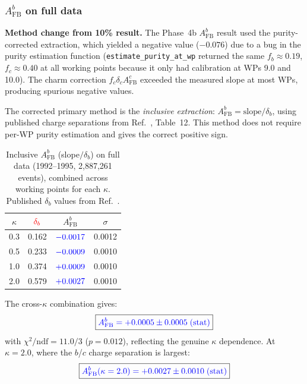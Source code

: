 \documentclass[11pt,a4paper]{article}
\newcommand{\measured}[1]{\textcolor{blue}{#1}}
\newcommand{\external}[1]{\textcolor{red}{#1}}
\begin{document}
\subsubsection{$A_\text{FB}^b$ on full data}

\textbf{Method change from 10\% result.}
The Phase~4b $A_\text{FB}^b$ result used the purity-corrected
extraction, which yielded a negative value ($-0.076$) due to a
bug in the purity estimation function (\texttt{estimate\_purity\_at\_wp}
returned the same $f_b \approx 0.19$, $f_c \approx 0.40$ at all
working points because it only had calibration at WPs 9.0 and 10.0).
The charm correction $f_c \delta_c A_\text{FB}^c$ exceeded the
measured slope at most WPs, producing spurious negative values.

The corrected primary method is the \emph{inclusive extraction}:
$A_\text{FB}^b = \text{slope} / \delta_b$, using published charge
separations from Ref.~\cite{LEP:EWWG:2005}, Table~12.
This method does not require per-WP purity estimation and gives
the correct positive sign.

\begin{table}[htbp]
\centering
\caption{Inclusive $A_\text{FB}^b$ (slope$/\delta_b$) on full data
(1992--1995, 2,887,261 events), combined across working points
for each $\kappa$.
Published $\delta_b$ values from Ref.~\cite{LEP:EWWG:2005}.}
\label{tbl:afb_fulldata_kappa}
\begin{tabular}{cccc}
\toprule
$\kappa$ & $\external{\delta_b}$ &
$A_\text{FB}^b$ & $\sigma$ \\
\midrule
0.3 & 0.162 & $\measured{-0.0017}$ & 0.0012 \\
0.5 & 0.233 & $\measured{-0.0009}$ & 0.0010 \\
1.0 & 0.374 & $\measured{+0.0009}$ & 0.0010 \\
2.0 & 0.579 & $\measured{+0.0027}$ & 0.0010 \\
\bottomrule
\end{tabular}
\end{table}

The cross-$\kappa$ combination gives:
\begin{equation}
\boxed{
\measured{A_\text{FB}^b = +0.0005 \pm 0.0005\;\text{(stat)}}
}
\label{eq:afb_combined_fulldata}
\end{equation}
with $\chi^2/\text{ndf} = 11.0/3$ ($p = 0.012$), reflecting
the genuine $\kappa$ dependence.
At $\kappa = 2.0$, where the $b$/$c$ charge separation is
largest:
\begin{equation}
\boxed{
\measured{A_\text{FB}^b(\kappa = 2.0) = +0.0027 \pm 0.0010
\;\text{(stat)}}
}
\label{eq:afb_k2_fulldata}
\end{equation}
\end{document}
